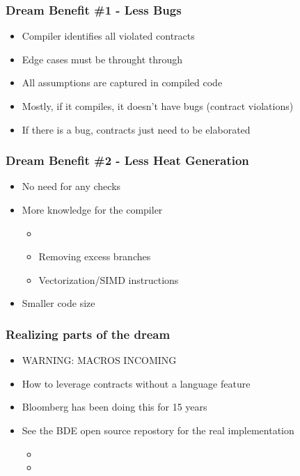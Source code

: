 \begin{frame}
  \frametitle{Dream Benefit \#1 - Less Bugs}
  \pause
  \begin{itemize}
  \item Compiler identifies all violated contracts \pause
  \item Edge cases must be throught through \pause
  \item All assumptions are captured in compiled code \pause
  \item Mostly, if it compiles, it doesn't have bugs (contract violations) \pause
  \item If there is a bug, contracts just need to be elaborated
  \end{itemize}
\end{frame}

\begin{frame}
  \frametitle{Dream Benefit \#2 - Less Heat Generation}
  \pause
  \begin{itemize}
  \item No need for any checks \pause
  \item More knowledge for the compiler \pause
    \begin{itemize}
    \item {} \pause
    \item Removing excess branches \pause
    \item Vectorization/SIMD instructions \pause
    \end{itemize}
  \item Smaller code size
  \end{itemize}
\end{frame}

\begin{frame}
  \frametitle{Realizing parts of the dream}
  \begin{itemize}
  \item WARNING: \pause MACROS INCOMING \pause
    
  \item How to leverage contracts without a language feature \pause
  \item Bloomberg has been doing this for 15 years \pause
  \item See the BDE open source repostory for the real implementation
    \begin{itemize}
      \item {}
      \item {}
    \end{itemize}
  \end{itemize}
\end{frame}

